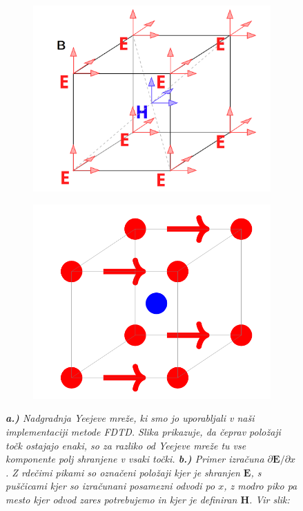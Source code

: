 \documentclass[longbibliography,slovene,a4paper,12pt]{book}
\begin{document}
\begin{figure}[h!]
	\centering
	\begin{subfigure}[b]{0.45\textwidth}
	\includegraphics[width=\textwidth]{slike/our_lattice_fields.png}
	\label{fig:ourlatticefields}
	\end{subfigure}\quad
	\begin{subfigure}[b]{0.45\textwidth}
	\includegraphics[width=\textwidth]{slike/our_lattice_derivatives.png}
	\label{fig:ourlatticederivatives}
	\end{subfigure}
	\caption{\emph{\textbf{a.)} Nadgradnja Yeejeve mreže, ki smo jo uporabljali v naši implementaciji metode FDTD. Slika prikazuje, da čeprav položaji točk ostajajo enaki, so za razliko od Yeejeve mreže tu vse komponente polj shranjene v vsaki točki. \textbf{b.)} Primer izračuna $\partial \mathbf{E}/\partial x$. Z rdečimi pikami so označeni položaji kjer je shranjen $\mathbf{E}$, s puščicami kjer so izračunani posamezni odvodi po $x$, z modro piko pa mesto kjer odvod zares potrebujemo in kjer je definiran $\mathbf{H}$. Vir slik: \cite{cancula}}}
\end{figure}
\end{document}
